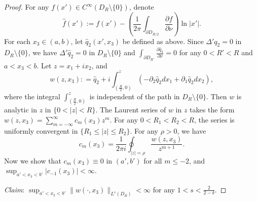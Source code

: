\documentclass[12pt]{article}
\begin{document}
\begin{proof}
	For any $f(x')\in C^{\infty}(D_R\setminus\{0\})$, denote 
	\begin{equation}\label{eq:lem:2_2:pf:5}
		\hat{f}(x'):=f(x')-\left(\frac{1}{2\pi}\int_{\partial D_{R/2}}\frac{\partial f}{\partial \nu}\right)\ln |x'|.
	\end{equation}
	For each $x_3\in (a, b)$, let $\hat{q}_2(x', x_3)$ be defined as above. Since $\Delta' q_2=0$ in $D_R\setminus\{0\}$, we have $\Delta' \hat{q}_2=0$ in $D_R\setminus\{0\}$ and $\int_{\partial D_{R'}}\frac{\partial \hat{q}_2}{\partial \nu}=0$ for any $0<R'<R$ and $a<x_3<b$. Let $z=x_1+ix_2$, and
	\[
		w(z, x_3): 
		=\hat{q}_2+i \int_{(\frac{R}{2}, 0)}^z(-\partial_2\hat{q}_2 dx_1+\partial_1\hat{q}_2dx_2), 
	\]
	where the integral $\int_{(\frac{R}{2}, 0)}^{z}$ is independent of the path in $D_R\setminus\{0\}$. 
	Then $w$ is analytic in $z$ in $\{0<|z|< R\}$. 
	The Laurent series of $w$ in $z$ takes the form $w(z, x_3)=\sum_{m=-\infty}^{\infty} c_m(x_3) z^m$. 
	For any $0<R_1<R_2<R$, the series is uniformly convergent in $\{ R_1\le |z|\le R_2\}$. For 
	any $\rho>0$, we have 
	\begin{equation}\label{eq:lem:2_2:pf:6}
		c_m(x_3)=\frac{1}{2\pi i}\oint_{|z|=\rho} \frac{w(z, x_3)}{z^{m+1}}. 
	\end{equation}
	Now we show that $c_m(x_3)\equiv 0$ in $(a', b')$ for all $m\le -2$, 
	and $\sup_{a'<x_3<b'}|c_{-1}(x_3)|<\infty$. 
	
	\noindent\emph{Claim}: 
	$\sup_{a'<x_3<b'} \|w(\cdot, x_3)\|_{L^{s}(D_{R})}<\infty$ for any $1<s<\frac{2}{2-\delta}$.
	

\end{proof}
\end{document}
